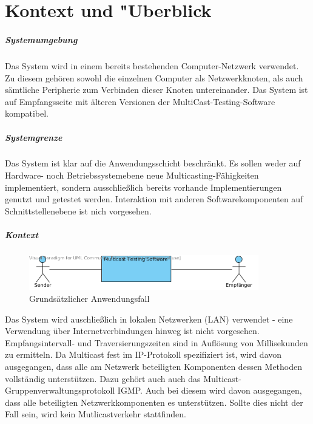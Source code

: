 \chapter{Kontext und "Uberblick}
\label{cha:kont}

\paragraph{Systemumgebung}
Das System wird in einem bereits bestehenden Computer-Netzwerk verwendet. Zu
diesem gehören sowohl die einzelnen Computer als Netzwerkknoten, als auch
sämtliche Peripherie zum Verbinden dieser Knoten untereinander. Das System
ist auf Empfangsseite mit älteren Versionen
der MultiCast-Testing-Software kompatibel.

\paragraph{Systemgrenze}
Das System ist klar auf die Anwendungsschicht beschränkt. Es sollen weder auf
Hardware- noch Betriebssystemebene neue Multicasting-Fähigkeiten implementiert, sondern ausschließlich bereits vorhande Implementierungen genutzt und
getestet werden. Interaktion mit anderen Softwarekomponenten auf
Schnittstellenebene ist nich vorgesehen.

\paragraph{Kontext}
\begin{figure}
\includegraphics[width=10cm]{images/kontext-usecase.png}
\centering
\caption{Grundsätzlicher Anwendungsfall}
\end{figure}
Das System wird auschließlich in lokalen Netzwerken (LAN) verwendet - eine
Verwendung über Internetverbindungen hinweg ist nicht vorgesehen.
Empfangsintervall- und Traversierungszeiten sind in Auflösung von Millisekunden
zu ermitteln. Da Multicast fest im IP-Protokoll spezifiziert ist, wird davon
ausgegangen, dass alle am Netzwerk beteiligten Komponenten dessen Methoden
vollständig unterstützen. Dazu gehört auch auch das
Multicast-Gruppenverwaltungsprotokoll IGMP. Auch bei diesem wird davon
ausgegangen, dass alle beteiligten Netzwerkkomponenten es unterstützen. Sollte
dies nicht der Fall sein, wird kein Mutlicastverkehr stattfinden.
